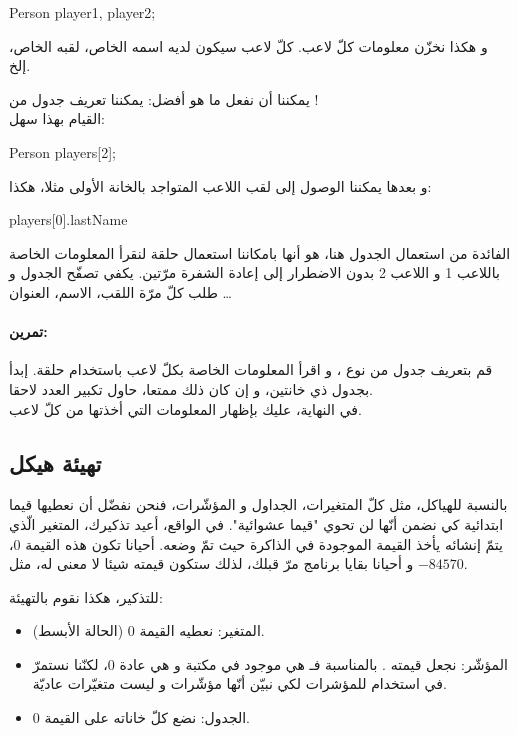 \begin{Csource}
Person player1, player2;
\end{Csource}

و هكذا نخزّن معلومات كلّ لاعب. كلّ لاعب سيكون لديه اسمه الخاص، لقبه الخاص، إلخ.

يمكننا أن نفعل ما هو أفضل: يمكننا تعريف جدول من
!\\
القيام بهذا سهل:

\begin{Csource}
Person players[2];
\end{Csource}

و بعدها يمكننا الوصول إلى لقب اللاعب المتواجد بالخانة الأولى مثلا، هكذا:

\begin{Console}
players[0].lastName
\end{Console}

الفائدة من استعمال الجدول هنا، هو أنها بامكاننا استعمال حلقة لنقرأ المعلومات الخاصة باللاعب 1 و اللاعب 2 بدون الاضطرار إلى إعادة الشفرة مرّتين. يكفي تصفّح الجدول
و طلب كلّ مرّة اللقب، الاسم، العنوان \dots

\paragraph{تمرين:}
قم بتعريف جدول من نوع
،
و اقرأ المعلومات الخاصة بكلّ لاعب باستخدام حلقة. إبدأ بجدول ذي خانتين، و إن كان ذلك ممتعا، حاول تكبير العدد لاحقا.\\
في النهاية، عليك بإظهار المعلومات التي أخذتها من كلّ لاعب.

\subsection{تهيئة هيكل}

بالنسبة للهياكل، مثل كلّ المتغيرات، الجداول و المؤشّرات، فنحن نفضّل أن نعطيها قيما ابتدائية كي نضمن أنّها لن تحوي "قيما عشوائية". في الواقع، أعيد تذكيرك، المتغير الّذي يتمّ إنشائه يأخذ القيمة الموجودة في الذاكرة حيث تمّ وضعه. أحيانا تكون هذه القيمة $ 0 $، و أحيانا بقايا برنامج مرّ قبلك، لذلك ستكون قيمته شيئا لا معنى له، مثل
$-84570$.

للتذكير، هكذا نقوم بالتهيئة:

\begin{itemize}
  \item  المتغير: نعطيه القيمة 0 (الحالة الأبسط).
  \item المؤشّر: نجعل قيمته
.
بالمناسبة فـ
هي
موجود في مكتبة
و هي عادة 0، لكنّنا نستمرّ في استخدام
للمؤشرات لكي نبيّن أنّها مؤشّرات و ليست متغيّرات عاديّة.
  \item الجدول: نضع كلّ خاناته على القيمة 0.
\end{itemize}

